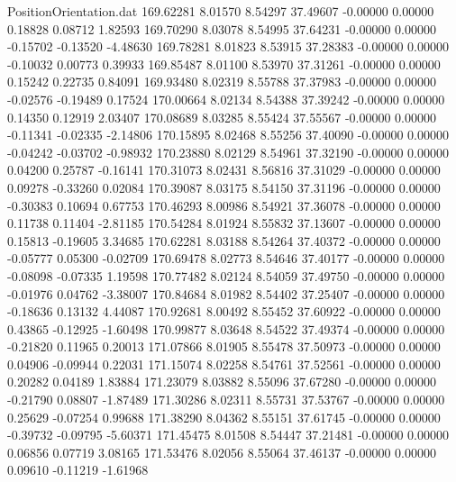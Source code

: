 \begin{filecontents}{PositionOrientation.dat}
 169.62281    8.01570    8.54297    37.49607   -0.00000    0.00000    0.18828    0.08712    1.82593
 169.70290    8.03078    8.54995    37.64231   -0.00000    0.00000   -0.15702   -0.13520   -4.48630
 169.78281    8.01823    8.53915    37.28383   -0.00000    0.00000   -0.10032    0.00773    0.39933
 169.85487    8.01100    8.53970    37.31261   -0.00000    0.00000    0.15242    0.22735    0.84091
 169.93480    8.02319    8.55788    37.37983   -0.00000    0.00000   -0.02576   -0.19489    0.17524
 170.00664    8.02134    8.54388    37.39242   -0.00000    0.00000    0.14350    0.12919    2.03407
 170.08689    8.03285    8.55424    37.55567   -0.00000    0.00000   -0.11341   -0.02335   -2.14806
 170.15895    8.02468    8.55256    37.40090   -0.00000    0.00000   -0.04242   -0.03702   -0.98932
 170.23880    8.02129    8.54961    37.32190   -0.00000    0.00000    0.04200    0.25787   -0.16141
 170.31073    8.02431    8.56816    37.31029   -0.00000    0.00000    0.09278   -0.33260    0.02084
 170.39087    8.03175    8.54150    37.31196   -0.00000    0.00000   -0.30383    0.10694    0.67753
 170.46293    8.00986    8.54921    37.36078   -0.00000    0.00000    0.11738    0.11404   -2.81185
 170.54284    8.01924    8.55832    37.13607   -0.00000    0.00000    0.15813   -0.19605    3.34685
 170.62281    8.03188    8.54264    37.40372   -0.00000    0.00000   -0.05777    0.05300   -0.02709
 170.69478    8.02773    8.54646    37.40177   -0.00000    0.00000   -0.08098   -0.07335    1.19598
 170.77482    8.02124    8.54059    37.49750   -0.00000    0.00000   -0.01976    0.04762   -3.38007
 170.84684    8.01982    8.54402    37.25407   -0.00000    0.00000   -0.18636    0.13132    4.44087
 170.92681    8.00492    8.55452    37.60922   -0.00000    0.00000    0.43865   -0.12925   -1.60498
 170.99877    8.03648    8.54522    37.49374   -0.00000    0.00000   -0.21820    0.11965    0.20013
 171.07866    8.01905    8.55478    37.50973   -0.00000    0.00000    0.04906   -0.09944    0.22031
 171.15074    8.02258    8.54761    37.52561   -0.00000    0.00000    0.20282    0.04189    1.83884
 171.23079    8.03882    8.55096    37.67280   -0.00000    0.00000   -0.21790    0.08807   -1.87489
 171.30286    8.02311    8.55731    37.53767   -0.00000    0.00000    0.25629   -0.07254    0.99688
 171.38290    8.04362    8.55151    37.61745   -0.00000    0.00000   -0.39732   -0.09795   -5.60371
 171.45475    8.01508    8.54447    37.21481   -0.00000    0.00000    0.06856    0.07719    3.08165
 171.53476    8.02056    8.55064    37.46137   -0.00000    0.00000    0.09610   -0.11219   -1.61968

\end{filecontents}
